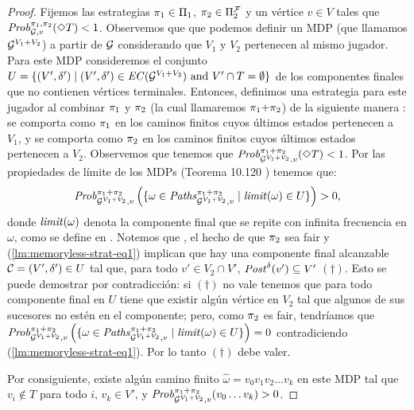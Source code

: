 \begin{proof}
  Fijemos las estrategias $\pi_{1} \in \Pi_{1}$, $\pi_{2} \in
  \Pi^{\mathcal{F}}_{2}$ y un vértice $v \in V$ tales que
  $\mathit{Prob}^{\pi_{1}, \pi_{2}}_{\mathcal{G}, v}(\Diamond T) < 1$.
  Observemos que que podemos definir un MDP (que llamamos $\mathcal{G}^{V_1{+}V_2}$) a partir de
  $\mathcal{G}$ considerando que $V_1$ y $V_2$ pertenecen al mismo jugador.  Para este MDP consideremos el conjunto $U = \{ (V',\delta')
  \mid(V',\delta') \in \mathit{EC}(\mathcal{G}^{V_1{+}V_2}) \text{ and }
  V'\cap T = \emptyset \}$ de los componentes finales que no contienen vértices terminales. Entonces, definimos una estrategia para este jugador al combinar
  $\pi_{1}$ y $\pi_{2}$ (la cual llamaremos $\pi_{1}{+}\pi_{2}$) de la siguiente manera
  : se comporta como $\pi_{1}$ en los caminos finitos cuyos últimos estados pertenecen a $V_1$, y se comporta como $\pi_{2}$ en los caminos finitos cuyos últimos estados pertenecen a $V_2$. Observemos que tenemos que
  $\mathit{Prob}^{\pi_{1}{+}\pi_{2}}_{\mathcal{G}^{V_1+V_2},v}(\Diamond T) <
  1$. Por las propiedades de límite de los MDPs (Teorema 10.120 \cite{BaierK08})
  tenemos que:
  \begin{equation}\label{lm:memoryless-strat-eq1}
    \mathit{Prob}^{\pi_{1}{+}\pi_{2}}_{\mathcal{G}^{V_1+V_2},v} \left(\{ \omega \in \mathit{Paths}^{\pi_{1}{+}\pi_{2}}_{\mathcal{G}^{V_1+V_2},v} \mid \mathit{limit}(\omega)  \in U \}\right) > 0,
  \end{equation}
  donde $\mathit{limit}(\omega)$ denota la componente final que se repite con infinita frecuencia en $\omega$, como se define en \cite{BaierK08}.  Notemos que
  , el hecho de que $\pi_{2}$ sea fair y
  (\ref{lm:memoryless-strat-eq1}) implican que hay una componente final alcanzable $\mathcal{C}= (V',\delta') \in U$ tal que, para todo
  $v' \in V_2 \cap V'$, $\mathit{Post}^\delta(v') \subseteq V'$ $(\dag)$.
  Esto se puede demostrar por contradicción: si $(\dag)$ no vale tenemos que para todo componente final en $U$ tiene que existir
  algún vértice en
  $V_2$ tal que algunos de sus sucesores no estén en el componente; pero,
  como $\pi_{2}$ es fair, tendríamos que
  $\mathit{Prob}^{\pi_{1}{+}\pi_{2}}_{\mathcal{G}^{V_1+V_2},v} \left ( \{ \omega \in \mathit{Paths}^{\pi_{1}{+}\pi_{2}}_{\mathcal{G}^{V_1+V_2},v} \mid \mathit{limit}(\omega) \in U \}\right) = 0$
  contradiciendo (\ref{lm:memoryless-strat-eq1}). Por lo tanto $(\dag)$ debe valer.

  Por consiguiente, existe algún camino finito $\hat{\omega} = v_0 v_1 v_2 \dots v_k$
  en este MDP tal que $v_i \notin T$ para todo $i$, $v_k \in V'$, y
  $\mathit{Prob}^{\pi_{1}{+}\pi_{2}}_{\mathcal{G}^{V_1+V_2},v}(v_0\dots v_k) > 0$.


\end{proof}
